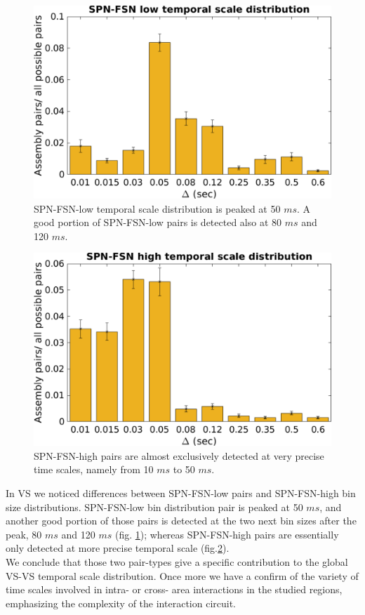 \begin{figure}
    \centering
    \includegraphics[scale=0.5]{figures/SPN_FSNlow1.pdf}
    \caption{SPN-FSN-low temporal scale distribution is peaked at 50 $ms$. A good portion of SPN-FSN-low pairs is detected also at 80 $ms$ and 120 $ms$.}
    \label{fig:SPN_FSNlowBin}
\end{figure}
\begin{figure}
    \centering
    \includegraphics[scale=0.5]{figures/SPN_FSNhigh1.pdf}
    \caption{SPN-FSN-high pairs are almost exclusively detected at very precise time scales, namely from 10 $ms$ to 50 $ms$.}
    \label{fig:SPN_FSNhighBin}
\end{figure}
In VS we noticed differences between SPN-FSN-low pairs and SPN-FSN-high bin size distributions. SPN-FSN-low bin distribution pair is peaked at 50 $ms$, and another good portion of those pairs is detected at the two next bin sizes after the peak, 80 $ms$ and 120 $ms$ (fig. \ref{fig:SPN_FSNlowBin}); whereas SPN-FSN-high pairs are essentially only detected at more precise temporal scale (fig.\ref{fig:SPN_FSNhighBin}).\\We conclude that those two pair-types give a specific contribution to the global VS-VS temporal scale distribution. Once more we have a confirm of the variety of time scales involved in intra- or cross- area interactions in the studied regions, emphasizing the complexity of the interaction circuit.
